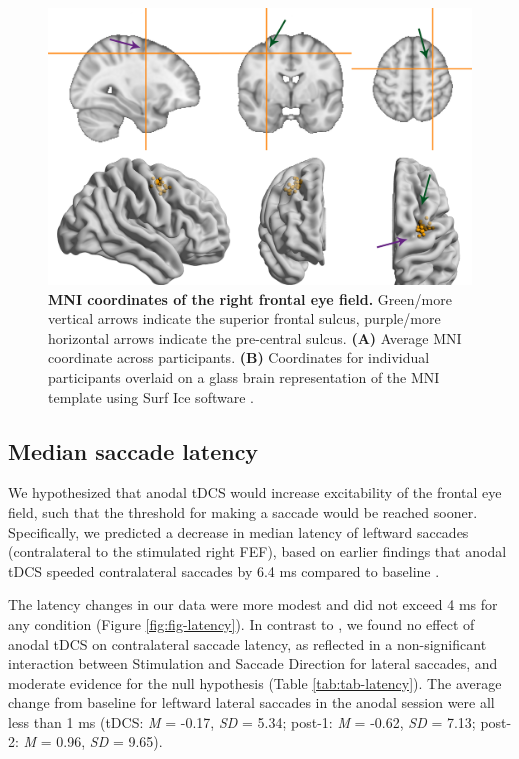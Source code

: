 \documentclass[11pt,]{memoir}
\begin{document}
\begin{figure}
\includegraphics[width=\textwidth]{sacc_tDCS_files/figures/figure_3_FEF} \caption{\textbf{MNI coordinates of the right frontal eye field.} Green/more vertical arrows indicate the superior frontal sulcus, purple/more horizontal arrows indicate the pre-central sulcus. \textbf{(A)} Average MNI coordinate across participants. \textbf{(B)} Coordinates for individual participants overlaid on a glass brain representation of the MNI template using Surf Ice software \autocite{Rorden2017}.}\label{fig:FEF}
\end{figure}



\hypertarget{median-saccade-latency}{%
\subsection{Median saccade latency}\label{median-saccade-latency}}

We hypothesized that anodal tDCS would increase excitability of the frontal eye field, such that the threshold for making a saccade would be reached sooner. Specifically, we predicted a decrease in median latency of leftward saccades (contralateral to the stimulated right FEF), based on earlier findings that anodal tDCS speeded contralateral saccades by 6.4 ms compared to baseline \autocite{Kanai2012}.

The latency changes in our data were more modest and did not exceed 4 ms for any condition (Figure \ref{fig:fig-latency}). In contrast to \textcite{Kanai2012}, we found no effect of anodal tDCS on contralateral saccade latency, as reflected in a non-significant interaction between Stimulation and Saccade Direction for lateral saccades, and moderate evidence for the null hypothesis (Table \ref{tab:tab-latency}). The average change from baseline for leftward lateral saccades in the anodal session were all less than 1 ms (tDCS: \emph{M} = -0.17, \emph{SD} = 5.34; post-1: \emph{M} = -0.62, \emph{SD} = 7.13; post-2: \emph{M} = 0.96, \emph{SD} = 9.65).
\end{document}
